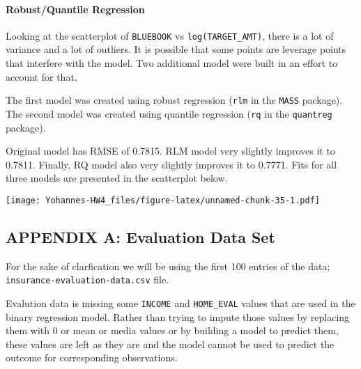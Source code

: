 \documentclass[]{article}
\let\oldparagraph\paragraph
\renewcommand{\paragraph}[1]{\oldparagraph{#1}\mbox{}}
\begin{document}
\paragraph{Robust/Quantile Regression}\label{robustquantile-regression}

Looking at the scatterplot of \texttt{BLUEBOOK} vs
\texttt{log(TARGET\_AMT)}, there is a lot of variance and a lot of
outliers. It is possible that some points are leverage points that
interfere with the model. Two additional model were built in an effort
to account for that.

The first model was created using robust regression (\texttt{rlm} in the
\texttt{MASS} package). The second model was created using quantile
regression (\texttt{rq} in the \texttt{quantreg} package).

Original model has RMSE of 0.7815. RLM model very slightly improves it
to 0.7811. Finally, RQ model also very slightly improves it to 0.7771.
Fits for all three models are presented in the scatterplot below.

\texttt{[image: Yohannes-HW4\_files/figure-latex/unnamed-chunk-35-1.pdf]}

\newpage

\subsection{APPENDIX A: Evaluation Data
Set}\label{appendix-a-evaluation-data-set}

For the sake of clarfication we will be using the first 100 entries of
the data; \texttt{insurance-evaluation-data.csv} file.

Evalution data is missing some \texttt{INCOME} and \texttt{HOME\_EVAL}
values that are used in the binary regression model. Rather than trying
to impute those values by replacing them with 0 or mean or media values
or by building a model to predict them, these values are left as they
are and the model cannot be used to predict the outcome for
corresponding observations.
\end{document}
